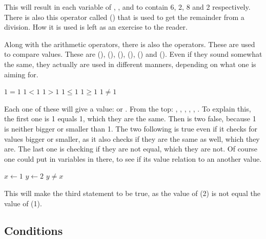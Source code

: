 This will result in each variable of , ,  and  to contain 6, 2, 8 and 2 respectively. There is also this operator called  (\code{\%}) that is used to get the remainder from a division. How it is used is left as an exercise to the reader.

Along with the arithmetic operators, there is also the  operators. These are used to compare values. These are  (\code{==}),  (\code{<}),  (\code{>}),  (\code{<=}),  (\code{>=}) and  (\code{!=}). Even if they sound somewhat the same, they actually are used in different manners, depending on what one is aiming for.

\begin{algorithm}[H]
	\begin{algorithmic}[1]
		\State $1 = 1$
		\State $1 < 1$
		\State $1 > 1$
		\State $1 \leq 1$
		\State $1 \geq 1$
		\State $1 \neq 1$
	\end{algorithmic}
\end{algorithm}

Each one of these will give a  value:  or . From the top: , , , , , . To explain this, the first one is 1 equals 1, which they are the same. Then is two false, because 1 is neither bigger or smaller than 1. The two following is true even if it checks for values bigger or smaller, as it also checks if they are the same as well, which they are. The last one is checking if they are not equal, which they are not.
Of course one could put in variables in there, to see if its value relation to an another value.

\begin{algorithm}[H]
	\begin{algorithmic}[1]
		\State $x \gets 1$
		\State $y \gets 2$
		\State $y \neq x$
	\end{algorithmic}
\end{algorithm}

This will make the third statement to be true, as the value of  (2) is not equal the value of  (1).

\subsection{Conditions}

